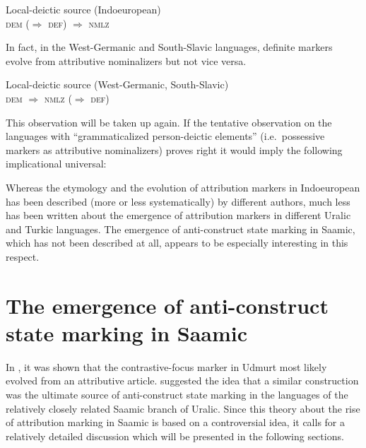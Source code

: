 {\begin{exe}
\ex Local-deictic source (Indoeuropean)\\
	\textsc{dem ($\Rightarrow$ def) $\Rightarrow$ nmlz}
\end{exe}
In fact, in the West-Germanic and South-Slavic languages, definite markers evolve from attributive nominalizers but not vice versa. 
\begin{exe}
\ex Local-deictic source (West-Germanic, South-Slavic)\\
	\textsc{dem $\Rightarrow$ nmlz ($\Rightarrow$ def)}
\end{exe}
This observation will be taken up again. If the tentative observation on the languages with “grammaticalized person-deictic elements” (i.e.~possessive markers as attributive nominalizers) proves right it would imply the following implicational universal:


\noindent Whereas the etymology and the evolution of attribution markers in Indoeuropean has been described (more or less systematically) by different authors, much less has been written about the emergence of attribution markers in different Uralic and Turkic languages. The emergence of anti-construct state marking in Saamic, which has not been described at all, appears to be especially interesting in this respect.

\section[Anti-construct state in Saamic]{The emergence of anti-construct state marking in Saamic} \label{saamic diachr}

In , it was shown that the contrastive-focus marker in Udmurt most likely evolved from an attributive article. \cite{riesler2006b} suggested the idea that a similar construction was the ultimate source of anti-construct state marking in the languages of the relatively closely related Saamic branch of Uralic. Since this theory about the rise of attribution marking in Saamic is based on a controversial idea, it calls for a relatively detailed discussion which will be presented in the following sections.

}
